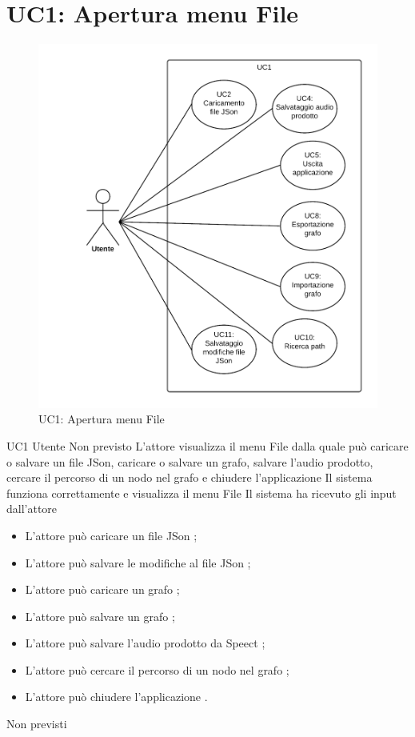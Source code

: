 \documentclass[../AnalisideiRequisiti.tex]{subfiles}
\begin{document}
	\section{UC1: Apertura menu File}
	\begin{figure}[H]
		
		\centering
		
		\includegraphics[width=\textwidth]{../img/UC1.png}
		
		\caption{UC1: Apertura menu File}
		
	\end{figure}
	\UserCase
	{UC1}
	{Utente}
	{Non previsto}
	{L'attore visualizza il menu File dalla quale può caricare o salvare un file JSon, caricare o salvare un grafo, salvare l'audio prodotto, cercare il percorso di un nodo nel grafo e chiudere l'applicazione}
	{Il sistema funziona correttamente e visualizza il menu File}
	{Il sistema ha ricevuto gli input dall'attore}
	{	\begin{itemize}
		\item{} L'attore può caricare un file JSon ;
		\item{} L'attore può salvare le modifiche al file JSon ;
		\item{} L'attore può caricare un grafo ;
		\item{} L'attore può salvare un grafo ;
		\item{} L'attore può salvare l'audio prodotto da Speect ;
		\item{} L'attore può cercare il percorso di un nodo nel grafo ;
		\item{} L'attore può chiudere l'applicazione .
		\end{itemize}
	}
	{Non previsti}
\end{document}
